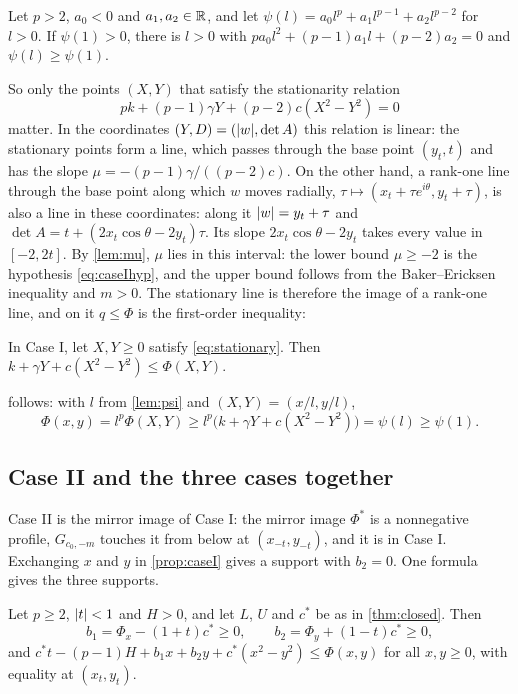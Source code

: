 \begin{lemma}\label{lem:psi}
Let $p>2$, $a_0<0$ and $a_1,a_2\in\mathbb{R}$, and let $\psi(l)=a_0l^p+a_1l^{p-1}+a_2l^{p-2}$ for
$l>0$. If $\psi(1)>0$, there is $l>0$ with $pa_0l^2+(p-1)a_1l+(p-2)a_2=0$ and
$\psi(l)\ge\psi(1)$.
\end{lemma}

So only the points $(X,Y)$ that satisfy the stationarity relation
\begin{equation}\label{eq:stationary}
  pk+(p-1)\gamma Y+(p-2)c(X^2-Y^2)=0
\end{equation}
matter. In the coordinates $(Y,D)=(\lvert w\rvert,\det A)$ this relation is linear: the stationary
points form a line, which passes through the base point $(y_t,t)$ and has the slope
$\mu=-(p-1)\gamma/((p-2)c)$. On the other hand, a rank-one line through the base point along
which $w$ moves radially, $\tau\mapsto(x_t+\tau e^{i\theta},y_t+\tau)$, is also a line in these
coordinates: along it $\lvert w\rvert=y_t+\tau$ and $\det A=t+(2x_t\cos\theta-2y_t)\tau$. Its slope
$2x_t\cos\theta-2y_t$ takes every value in $[-2,2t]$. By \cref{lem:mu}, $\mu$ lies in this
interval: the lower bound $\mu\ge-2$ is the hypothesis \eqref{eq:caseIhyp}, and the upper bound
follows from the Baker--Ericksen inequality and $m>0$. The stationary line is therefore the image
of a rank-one line, and on it $q\le\Phi$ is the first-order inequality:

\begin{lemma}\label{lem:line}
In Case I, let $X,Y\ge0$ satisfy \eqref{eq:stationary}. Then
$k+\gamma Y+c(X^2-Y^2)\le\Phi(X,Y)$.
\end{lemma}

 follows: with $l$ from \cref{lem:psi} and $(X,Y)=(x/l,y/l)$,
\[
  \Phi(x,y)=l^p\Phi(X,Y)\ge l^p\bigl(k+\gamma Y+c(X^2-Y^2)\bigr)=\psi(l)\ge\psi(1).
\]

\subsection{Case II and the three cases together}\label{sec:clamp}

Case II is the mirror image of Case I: the mirror image $\Phi^\ast$ is a nonnegative profile,
$G_{c_0,-m}$ touches it from below at $(x_{-t},y_{-t})$, and it is in Case I. Exchanging $x$ and
$y$ in \cref{prop:caseI} gives a support with $b_2=0$. One formula gives the three supports.

\begin{proposition}\label{prop:clamp}
Let $p\ge2$, $\lvert t\rvert<1$ and $H>0$, and let $L$, $U$ and $c^\ast$ be as in \cref{thm:closed}.
Then
\[
  b_1=\Phi_x-(1+t)c^\ast\ge0,\qquad b_2=\Phi_y+(1-t)c^\ast\ge0,
\]
and $c^\ast t-(p-1)H+b_1x+b_2y+c^\ast(x^2-y^2)\le\Phi(x,y)$ for all $x,y\ge0$, with equality at
$(x_t,y_t)$.
\end{proposition}


